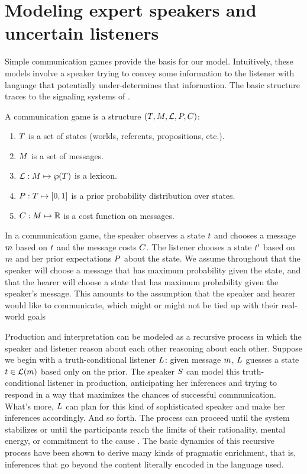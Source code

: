 \section{Modeling expert speakers and uncertain listeners}\label{sec:model}

Simple communication games provide the basis for our
model. Intuitively, these models involve a speaker trying to convey
some information to the listener with language that potentially
under-determines that information.  The basic structure traces to the
signaling systems of \cite{Lewis69}.

\begin{definition}\label{def:struc} 
  A communication game is a structure $(T, M, \mathcal{L}, P, C)$:
  \begin{enumerate}\setlength{\itemsep}{0pt}
  \item $T$ is a set of states (worlds, referents, propositions, etc.).
  \item $M$ is a set of messages.
  \item $\mathcal{L}: M \mapsto \wp(T)$ is a lexicon.
  \item $P : T \mapsto [0,1]$ is a prior probability
    distribution over states.   
  \item $C : M \mapsto \mathbb{R}$ is a cost function on messages.
  \end{enumerate}
\end{definition}

In a communication game, the speaker observes a state $t$ and
chooses a message $m$ based on $t$ and the message costs
$C$. The listener chooses a state $t'$ based on $m$ and
her prior expectations $P$ about the state.  We assume throughout
that the speaker will choose a message that has maximum probability
given the state, and that the hearer will choose a state that has
maximum probability given the speaker's message.  This amounts to the
assumption that the speaker and hearer would like to communicate,
which might or might not be tied up with their real-world goals
\cite{Franke-etal:2009,Asher:Lascarides:2013}

Production and interpretation can be modeled as a recursive process in
which the speaker and listener reason about each other reasoning about
each other.  Suppose we begin with a truth-conditional listener
$L$: given message $m$, $L$ guesses a
state $t \in \mathcal{L}(m)$ based only on the prior.  The speaker
$S$ can model this truth-conditional listener in
production, anticipating her inferences and trying to respond in a way
that maximizes the chances of successful communication.  What's more,
$L$ can plan for this kind of sophisticated speaker and
make her inferences accordingly.  And so forth. The process can
proceed until the system stabilizes or until the participants reach
the limits of their rationality, mental energy, or commitment to the
cause
\cite{CamererHo:2004,Franke:2008,Franke09DISS,Jaeger:2007,Jaeger:2011}.
The basic dynamics of this recursive process have been shown to derive
many kinds of pragmatic enrichment, that is, inferences that go beyond
the content literally encoded in the language used.

